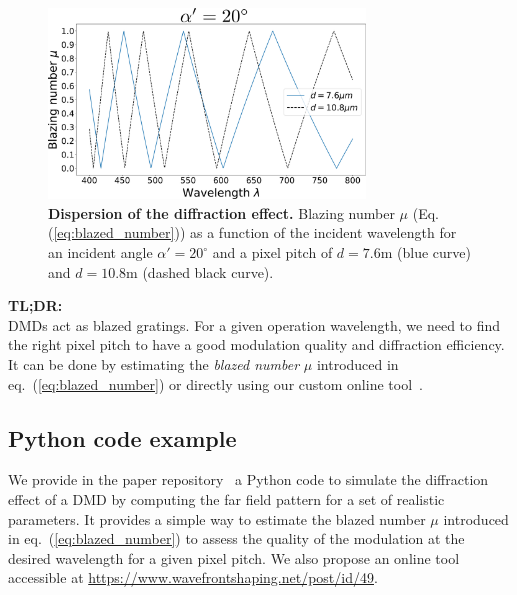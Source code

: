 \documentclass[12pt]{iopart}
\begin{document}
\begin{figure}[ht]
  \centering
  \includegraphics[width = 0.75\textwidth]{images/blazing_number_VS_wavelength.pdf}
  \caption{
    \textbf{Dispersion of the diffraction effect.}
    Blazing number $\mu$ (Eq.(\ref{eq:blazed_number})) as a function of the incident wavelength
    for an incident angle $\alpha' = 20^\circ$
    and a pixel pitch of $d=7.6$\textmu m (blue curve)
    and $d=10.8$\textmu m (dashed black curve).
  }
  \label{fig:dispersion}
\end{figure}



\begin{tldr}
  \textbf{TL;DR:}\\
  DMDs act as blazed gratings.
  For a given operation wavelength,
  we need to find the right pixel pitch
  to have a good modulation quality
  and diffraction efficiency.
  It can be done by estimating the \textit{blazed number} $\mu$ introduced in eq.~(\ref{eq:blazed_number})
  or directly using our custom online tool~\cite{popoffDMDDiffractionTool}.
\end{tldr}


\subsection{Python code example}

We provide in the paper repository~\cite{github} a Python code
to simulate the diffraction effect of a DMD
by computing the far field pattern for a set of realistic parameters.
It provides a simple way to estimate the blazed number $\mu$ introduced in eq.~(\ref{eq:blazed_number})
to assess the quality of the modulation at the desired wavelength
for a given pixel pitch.
We also propose an online tool accessible at
\url{https://www.wavefrontshaping.net/post/id/49}.




\end{document}
